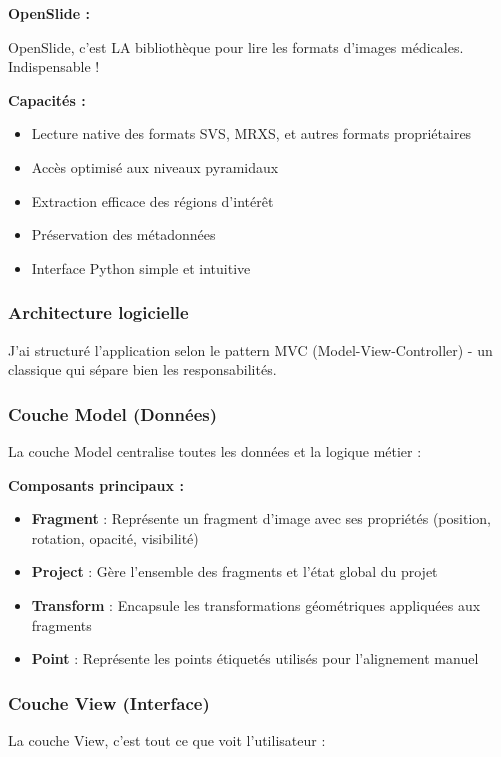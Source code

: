\documentclass[11pt,a4paper]{report}
\begin{document}
\textbf{OpenSlide :}

OpenSlide, c'est LA bibliothèque pour lire les formats d'images médicales. Indispensable !

\textbf{Capacités :}
\begin{itemize}
\item Lecture native des formats SVS, MRXS, et autres formats propriétaires
\item Accès optimisé aux niveaux pyramidaux
\item Extraction efficace des régions d'intérêt
\item Préservation des métadonnées
\item Interface Python simple et intuitive
\end{itemize}

\subsubsection{Architecture logicielle}

J'ai structuré l'application selon le pattern MVC (Model-View-Controller) - un classique qui sépare bien les responsabilités.

\subsubsection{Couche Model (Données)}

La couche Model centralise toutes les données et la logique métier :

\textbf{Composants principaux :}
\begin{itemize}
\item \textbf{Fragment} : Représente un fragment d'image avec ses propriétés (position, rotation, opacité, visibilité)
\item \textbf{Project} : Gère l'ensemble des fragments et l'état global du projet
\item \textbf{Transform} : Encapsule les transformations géométriques appliquées aux fragments
\item \textbf{Point} : Représente les points étiquetés utilisés pour l'alignement manuel
\end{itemize}

\subsubsection{Couche View (Interface)}

La couche View, c'est tout ce que voit l'utilisateur :
\end{document}
